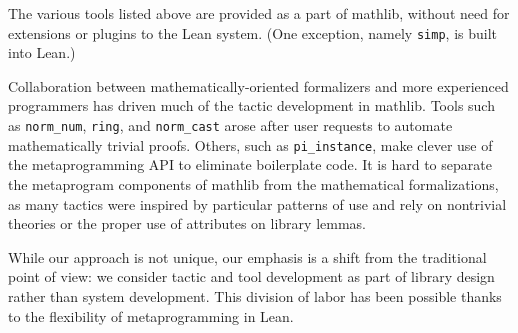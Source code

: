 \documentclass[sigplan]{acmart}\settopmatter{}
\newcommand{\mathlib}{\textsf{mathlib}\xspace}
\begin{document}
The various tools listed above
are provided as a part of \mathlib,
without need for extensions or plugins to the Lean system.
(One exception, namely \lstinline{simp}, is built into Lean.)

Collaboration between mathematically-oriented formalizers
and more experienced programmers
has driven much of the tactic development in \mathlib.
Tools such as \lstinline{norm_num}, \lstinline{ring}, and \lstinline{norm_cast} arose after user requests
to automate mathematically trivial proofs.
Others, such as \lstinline{pi_instance},
make clever use of the metaprogramming API
to eliminate boilerplate code.
It is hard to separate the metaprogram components of \mathlib
from the mathematical formalizations,
as many tactics were inspired by particular patterns of use
and rely on nontrivial theories
or the proper use of attributes on library lemmas.


While our approach is not unique,
our emphasis is a shift from the traditional point of view:
we consider tactic and tool development as part of library design
rather than system development.
This division of labor has been possible thanks to the flexibility
of metaprogramming in Lean.

\end{document}
